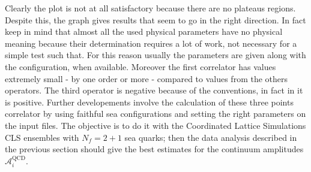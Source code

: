 \documentclass[english, LaM, oneside, noexaminfo]{sapthesis}
\begin{document}
\newline
Clearly the plot is not at all satisfactory because there are no plateaus regions.
Despite this, the graph gives results that seem to go in the right direction.
In fact keep in mind that almost all the used physical parameters have no physical meaning because their determination requires a lot of work, not necessary for a simple test such that.
For this reason usually the parameters are given along with the configuration, when available.
Moreover the first correlator has values extremely small - by one order or more - compared to values from the others operators.
The third operator is negative because of the conventions, in fact in \cite{KMBSM} it is positive.
\newline
Further developements involve the calculation of these three points correlator by using faithful sea configurations and setting the right parameters on the input files.
The objective is to do it with the Coordinated Lattice Simulations CLS ensembles with $N_f = 2+1$ sea quarks;
then the data analysis described in the previous section should give the best estimates for the continuum amplitudes $\mathcal{A}^\text{QCD}_i$.



\appendix %
\end{document}
